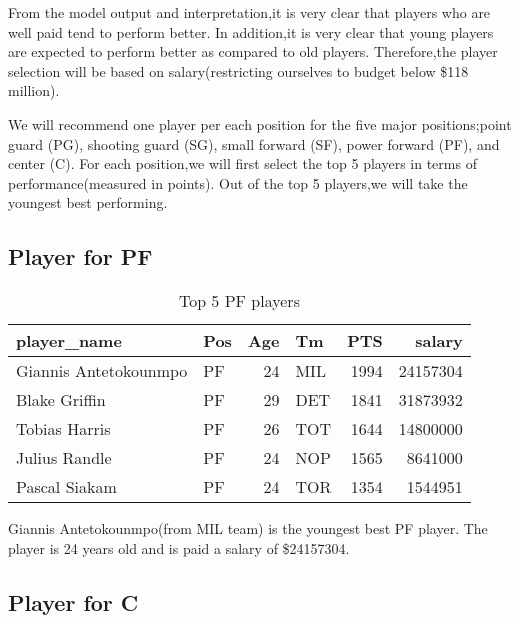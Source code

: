\documentclass[
]{article}
\begin{document}
From the model output and interpretation,it is very clear that players
who are well paid tend to perform better. In addition,it is very clear
that young players are expected to perform better as compared to old
players. Therefore,the player selection will be based on
salary(restricting ourselves to budget below \$118 million).

We will recommend one player per each position for the five major
positions;point guard (PG), shooting guard (SG), small forward (SF),
power forward (PF), and center (C). For each position,we will first
select the top 5 players in terms of performance(measured in points).
Out of the top 5 players,we will take the youngest best performing.

\hypertarget{player-for-pf}{%
\subsection{Player for PF}\label{player-for-pf}}

\begin{table}[!h]

\caption{\label{tab:unnamed-chunk-15}Top 5 PF players}
\centering
\begin{tabular}[t]{l|l|r|l|r|r}
\hline
player\_name & Pos & Age & Tm & PTS & salary\\
\hline
Giannis Antetokounmpo & PF & 24 & MIL & 1994 & 24157304\\
\hline
Blake Griffin & PF & 29 & DET & 1841 & 31873932\\
\hline
Tobias Harris & PF & 26 & TOT & 1644 & 14800000\\
\hline
Julius Randle & PF & 24 & NOP & 1565 & 8641000\\
\hline
Pascal Siakam & PF & 24 & TOR & 1354 & 1544951\\
\hline
\end{tabular}
\end{table}

Giannis Antetokounmpo(from MIL team) is the youngest best PF player. The
player is 24 years old and is paid a salary of \$24157304.

\hypertarget{player-for-c}{%
\subsection{Player for C}\label{player-for-c}}
\end{document}
